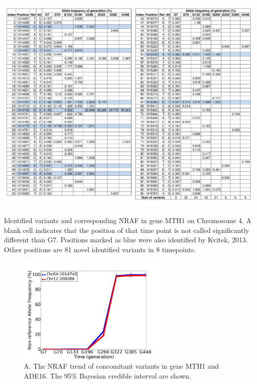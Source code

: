 \documentclass[11pt,reqno]{amsart}
\begin{document}
\begin{table}[htbp]
\centering
\includegraphics[width=1.0\textwidth]{tables/mutations_MTH1.png}
\caption{Identified variants and corresponding NRAF in gene MTH1 on Chromosome 4.
A blank cell indicates that the position of that time point is not called significantly different than G7.
Positions marked as blue were also identified by Kvitek, 2013.
Other positions are 81 novel identified variants in 8 timepoints.}
\label{tbl:mutations}
\end{table}
\begin{figure}[h]
\centering
\includegraphics[width=0.65\textwidth]{figs/concomitant.png}
\caption{A. The NRAF trend of concomitant variants in gene MTH1 and ADE16.
The 95\% Bayesian credible interval are shown.}
\label{tbl:concomitant}
\end{figure}
\end{document}

